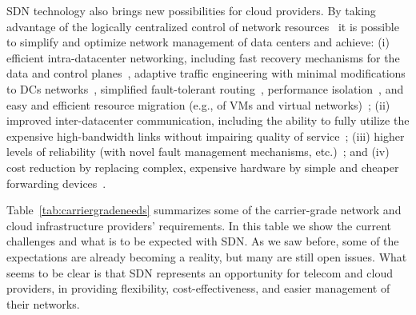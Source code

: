 SDN technology also brings new possibilities for cloud providers.
By taking advantage of the logically centralized control of network resources~\cite{hong2013,jain2013-1} it is possible to simplify and optimize network management of data centers and achieve:
(i) efficient intra-datacenter networking, including fast recovery mechanisms for the  data and control planes~\cite{sharma2013-1,staessens2011,sharma2013}, adaptive traffic engineering with minimal modifications to DCs networks~\cite{benson2011mTE}, simplified fault-tolerant routing~\cite{mysore2009}, performance isolation~\cite{greenberg2009}, and easy and efficient resource migration (e.g., of VMs and virtual networks)~\cite{sharma2013-1};
(ii) improved inter-datacenter communication, including the ability to fully utilize the expensive high-bandwidth links without impairing quality of service~\cite{jain2013-1,sadasivarao2013};
(iii) higher levels of reliability (with novel fault management mechanisms, etc.)~\cite{mysore2009,staessens2011,sharma2013-1,Adrichem2014}; and 
(iv) cost reduction by replacing complex, expensive hardware by simple and cheaper forwarding devices~\cite{tanner2013,jain2013-1}.



Table~\ref{tab:carriergradeneeds} summarizes some of the carrier-grade network and cloud infrastructure providers' requirements.
In this table we show the current challenges and what is to be expected with SDN.
As we saw before, some of the expectations are already becoming a reality, but many are still open issues.
What seems to be clear is that SDN represents an opportunity for telecom and cloud providers, in providing flexibility, cost-effectiveness, and easier management of their networks.

